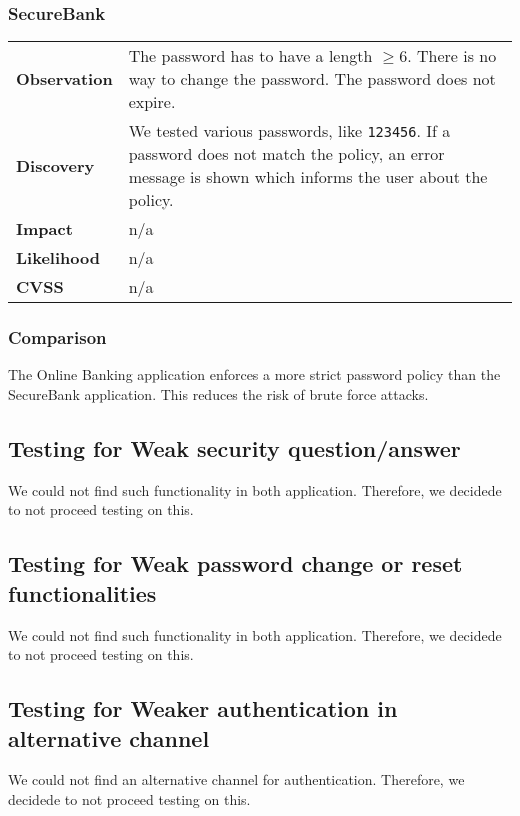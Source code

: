 \subsubsection*{SecureBank}

\begin{tabular}{l|p{10cm}}

\textbf{Observation} & The password has to have a length $\geq 6$. There is no way to change the password. The password does not expire. \\
\textbf{Discovery} &  We tested various passwords, like \texttt{123456}. If a password does not match the policy, an error message is shown which informs the user about the policy.  \\
\textbf{Impact} & n/a \\
\textbf{Likelihood} & n/a \\
\textbf{CVSS} & n/a \\
\end{tabular}

\subsubsection*{Comparison}
The Online Banking application enforces a more strict password policy than the SecureBank application. This reduces the risk of brute force attacks.

\clearpage

\subsection{Testing for Weak security question/answer}
We could not find such functionality in both application. Therefore, we decidede to not proceed testing on this.

\subsection{Testing for Weak password change or reset functionalities}
We could not find such functionality in both application. Therefore, we decidede to not proceed testing on this.

\subsection{Testing for Weaker authentication in alternative channel}
We could not find an alternative channel for authentication. Therefore, we decidede to not proceed testing on this.


